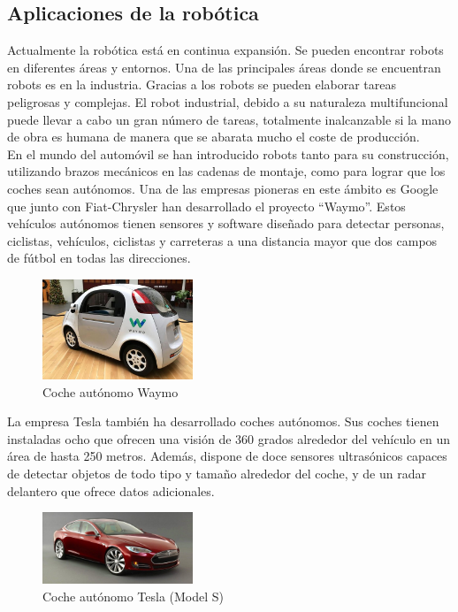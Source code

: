 \subsection{Aplicaciones de la robótica}
Actualmente la robótica está en continua expansión. Se pueden encontrar robots en diferentes áreas y entornos. Una de las principales áreas donde se encuentran robots es en la industria. Gracias a los robots se pueden elaborar tareas peligrosas y complejas. El robot industrial, debido a su naturaleza multifuncional puede llevar a cabo un gran número de tareas, totalmente inalcanzable si la mano de obra es humana de manera que se abarata mucho el coste de producción. \\

En el mundo del automóvil se han introducido robots tanto para su construcción, utilizando brazos mecánicos en las cadenas de montaje, como para lograr que los coches sean autónomos. Una de las empresas pioneras en este ámbito es Google que junto con Fiat-Chrysler han desarrollado el proyecto ``Waymo''. Estos vehículos autónomos tienen sensores y software diseñado para detectar personas, ciclistas, vehículos, ciclistas y carreteras a una distancia mayor que dos campos de fútbol en todas las direcciones. \\

\begin{figure}[H]
  \begin{center}
    \includegraphics[width=0.4\textwidth]{figures/Introduccion/waymo.jpg}
		\caption{Coche autónomo Waymo}
		\label{fig.waymo}
		\end{center}
\end{figure}

La empresa Tesla también ha desarrollado coches autónomos. Sus coches tienen instaladas ocho que ofrecen una visión de 360 grados alrededor del vehículo en un área de hasta 250 metros. Además, dispone de doce sensores ultrasónicos capaces de detectar objetos de todo tipo y tamaño alrededor del coche, y de un radar delantero que ofrece datos adicionales.

\begin{figure}[H]
  \begin{center}
    \includegraphics[width=0.4\textwidth]{figures/Introduccion/tesla.jpg}
		\caption{Coche autónomo Tesla (Model S)}
		\label{fig.tesla}
		\end{center}
\end{figure}

